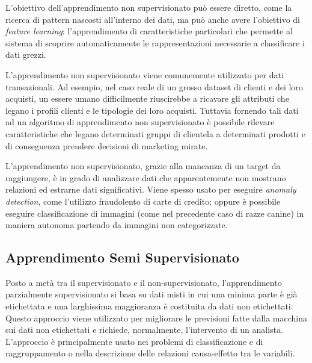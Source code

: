 L'obiettivo dell'apprendimento non supervisionato può essere diretto, come la ricerca di pattern nascosti all'interno dei dati, ma può anche avere l'obiettivo di \textit{feature learning}: l'apprendimento di caratteristiche particolari che permette al sistema di scoprire automaticamente le rappresentazioni necessarie a classificare i dati grezzi.

L'apprendimento non supervisionato viene comunemente utilizzato per dati transazionali. Ad esempio, nel caso reale di un grosso dataset di clienti e dei loro acquisti, un essere umano difficilmente riuscirebbe a ricavare gli attributi che legano i profili clienti e le tipologie dei loro acquisti. Tuttavia fornendo tali dati ad un algoritmo di  apprendimento non supervisionato è possibile rilevare caratteristiche che legano determinati gruppi di clientela a determinati prodotti e di conseguenza prendere decisioni di marketing mirate.

L'apprendimento non supervisionato, grazie alla mancanza di un target da raggiungere, è in grado di analizzare dati che   apparentemente non mostrano relazioni ed estrarne dati significativi. Viene spesso usato per eseguire \textit{anomaly detection}, come l'utilizzo fraudolento di carte di credito; oppure è possibile eseguire classificazione di immagini (come nel precedente caso di razze canine) in maniera autonoma partendo da immagini non categorizzate.

\subsection{Apprendimento Semi Supervisionato}
Posto a metà tra il supervisionato e il non-supervisionato, l'apprendimento parzialmente supervisionato si basa su dati misti in cui una minima parte è già etichettata e una larghissima maggioranza è costituita da dati non etichettati.  Questo approccio viene utilizzato per migliorare le previsioni fatte dalla macchina sui dati non etichettati e richiede, normalmente, l'intervento di un analista. L'approccio è principalmente usato nei problemi di classificazione e di raggruppamento o nella descrizione delle relazioni causa-effetto tra le variabili.

